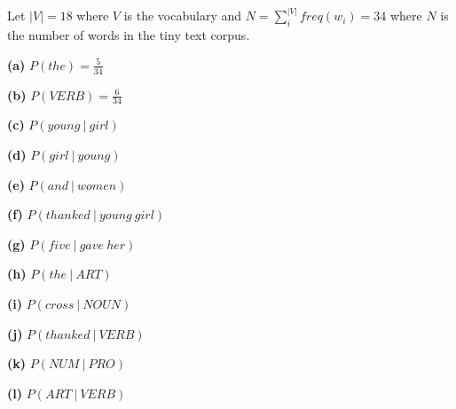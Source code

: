 \documentclass[11pt]{article}
\renewcommand\part[1]{\vspace{.10in}\textbf{(#1)}}
\begin{document}
Let $|V| = 18$ where $V$ is the vocabulary and  $N = \sum\limits_{i}^{|V|} freq(w_i) = 34$ where $N$ is the number of words in the tiny text corpus.

\part{a} $P(the) =  \frac{5}{34}$

\part{b} $P(VERB) = \frac{6}{34}$

\part{c} $P(young \ | \ girl)$

\part{d} $P(girl \ | \ young)$

\part{e} $P(and \ | \ women)$

\part{f} $P(thanked \ | \ young \ girl)$

\part{g} $P(five \ | \ gave \ her)$

\part{h} $P(the \ | \ ART)$

\part{i} $P(cross \ | \ NOUN)$

\part{j} $P(thanked \ | \ VERB)$

\part{k} $P(NUM \ | \ PRO)$

\part{l} $P(ART \ | \ VERB)$
\end{document}
